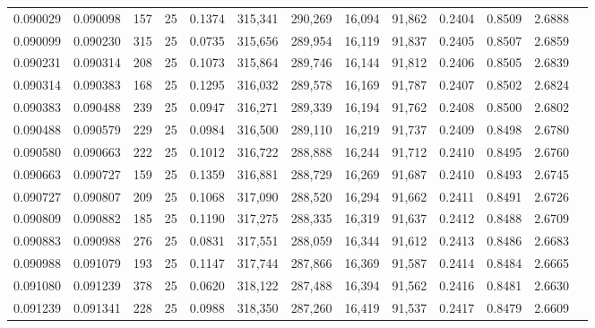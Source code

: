 \begin{tabular}{rrrrrrrrrrrrr}
0.090029 & 0.090098 &   157 &  25 &                                     0.1374 & 315,341 & 290,269 &  16,094 &  91,862 & 0.2404 & 0.8509 & 2.6888 \\
0.090099 & 0.090230 &   315 &  25 &                                     0.0735 & 315,656 & 289,954 &  16,119 &  91,837 & 0.2405 & 0.8507 & 2.6859 \\
0.090231 & 0.090314 &   208 &  25 &                                     0.1073 & 315,864 & 289,746 &  16,144 &  91,812 & 0.2406 & 0.8505 & 2.6839 \\
0.090314 & 0.090383 &   168 &  25 &                                     0.1295 & 316,032 & 289,578 &  16,169 &  91,787 & 0.2407 & 0.8502 & 2.6824 \\
0.090383 & 0.090488 &   239 &  25 &                                     0.0947 & 316,271 & 289,339 &  16,194 &  91,762 & 0.2408 & 0.8500 & 2.6802 \\
0.090488 & 0.090579 &   229 &  25 &                                     0.0984 & 316,500 & 289,110 &  16,219 &  91,737 & 0.2409 & 0.8498 & 2.6780 \\
0.090580 & 0.090663 &   222 &  25 &                                     0.1012 & 316,722 & 288,888 &  16,244 &  91,712 & 0.2410 & 0.8495 & 2.6760 \\
0.090663 & 0.090727 &   159 &  25 &                                     0.1359 & 316,881 & 288,729 &  16,269 &  91,687 & 0.2410 & 0.8493 & 2.6745 \\
0.090727 & 0.090807 &   209 &  25 &                                     0.1068 & 317,090 & 288,520 &  16,294 &  91,662 & 0.2411 & 0.8491 & 2.6726 \\
0.090809 & 0.090882 &   185 &  25 &                                     0.1190 & 317,275 & 288,335 &  16,319 &  91,637 & 0.2412 & 0.8488 & 2.6709 \\
0.090883 & 0.090988 &   276 &  25 &                                     0.0831 & 317,551 & 288,059 &  16,344 &  91,612 & 0.2413 & 0.8486 & 2.6683 \\
0.090988 & 0.091079 &   193 &  25 &                                     0.1147 & 317,744 & 287,866 &  16,369 &  91,587 & 0.2414 & 0.8484 & 2.6665 \\
0.091080 & 0.091239 &   378 &  25 &                                     0.0620 & 318,122 & 287,488 &  16,394 &  91,562 & 0.2416 & 0.8481 & 2.6630 \\
0.091239 & 0.091341 &   228 &  25 &                                     0.0988 & 318,350 & 287,260 &  16,419 &  91,537 & 0.2417 & 0.8479 & 2.6609 \\

\end{tabular}

